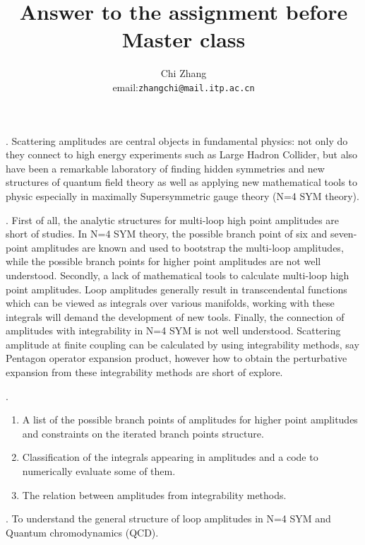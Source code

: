 \documentclass[a4paper,11pt]{article}
\title{\bf Answer to the assignment before Master class}
\author{Chi Zhang \\ email:\quad \tt{zhangchi@mail.itp.ac.cn}}
\date{}
\begin{document}
\fontsize{12}{15}
\selectfont
\iffalse

. Scattering amplitudes are central objects in fundamental physics: not only do they connect to high energy experiments such as Large Hadron Collider, but also have been a remarkable laboratory of finding hidden symmetries and new structures of quantum field theory as well as applying new mathematical tools to physic especially in maximally Supersymmetric gauge theory (N=4 SYM theory).

. First of all, the analytic structures for multi-loop high point amplitudes are short of studies. In N=4 SYM theory, the possible branch point of six and seven-point amplitudes are known and used to bootstrap the multi-loop amplitudes, while the possible branch points for higher point amplitudes are not well understood.
Secondly, a lack of mathematical tools to calculate multi-loop high point amplitudes. Loop amplitudes generally result in transcendental functions which can be viewed as integrals over various manifolds, working with these integrals will demand the development of new tools.
Finally, the connection of amplitudes with integrability in N=4 SYM is not well understood. Scattering amplitude at finite coupling can be calculated by using integrability methods, say Pentagon operator expansion product, however how to obtain the perturbative expansion from these integrability methods are short of explore. 


. 
\begin{enumerate}
    \item A list of the possible branch points of amplitudes for higher point amplitudes and constraints on the iterated branch points structure.
    \item Classification of the integrals appearing in amplitudes and a code to numerically evaluate some of them.
    \item The relation between amplitudes from integrability methods.
\end{enumerate}

. To understand the general structure of loop amplitudes in N=4 SYM and Quantum chromodynamics (QCD).
\end{document}
